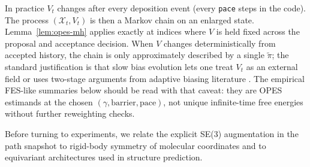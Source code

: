 \begin{remark}
In practice $V_t$ changes after every deposition event (every \texttt{pace} steps in the code). The process $(\mathcal{X}_t, V_t)$ is then a Markov chain on an enlarged state. Lemma~\ref{lem:opes-mh} applies exactly at indices where $V$ is held fixed across the proposal and acceptance decision. When $V$ changes deterministically from accepted history, the chain is only approximately described by a single $\tilde{\pi}$; the standard justification is that slow bias evolution lets one treat $V_t$ as an external field or uses two-stage arguments from adaptive biasing literature \citep{invernizzi2022}. The empirical FES-like summaries below should be read with that caveat: they are OPES estimands at the chosen $(\gamma, \mathrm{barrier}, \mathrm{pace})$, not unique infinite-time free energies without further reweighting checks.
\end{remark}

Before turning to experiments, we relate the explicit SE(3) augmentation in
the path snapshot to rigid-body symmetry of molecular coordinates and to
equivariant architectures used in structure prediction.
